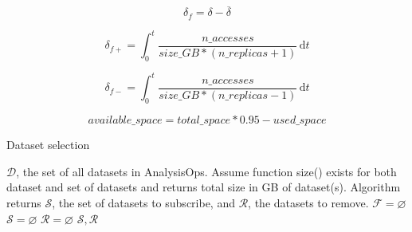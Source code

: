\documentclass[11pt,a4page]{article}
\begin{document}
    \begin{equation}\label{eq:delta_f}
      \delta_f = \delta - \overline{\delta}
    \end{equation}

    \begin{equation}\label{eq:delta_fp}
      \delta_{f+} = \int_0^t \! \frac{n\_accesses}{size\_GB*(n\_replicas+1)} \, \mathrm{d}t
    \end{equation}

    \begin{equation}\label{eq:delta_fm}
      \delta_{f-} = \int_0^t \! \frac{n\_accesses}{size\_GB*(n\_replicas-1)} \, \mathrm{d}t
    \end{equation}

    \begin{equation}\label{eq:avail}
      available\_space = total\_space*0.95 - used\_space
    \end{equation}

    \begin{algorithm} 
      \caption{Dataset selection} \label{alg:data_sel}
      \footnotesize
      \begin{algorithmic}[1]
        \REQUIRE $\mathcal{D}$, the set of all datasets in AnalysisOps. Assume function size() exists for both dataset and set of datasets and returns total size in GB of dataset(s). Algorithm returns $\mathcal{S}$, the set of datasets to subscribe, and $\mathcal{R}$, the datasets to remove.
        \STATE $\mathcal{F} = \varnothing$
         \label{for1}
        \ENDFOR
        \STATE $\mathcal{S} = \varnothing$
        \STATE $\mathcal{R} = \varnothing$
        \LOOP \label{loop1}
        \ENDLOOP
        \RETURN $\mathcal{S}, \mathcal{R}$
      \end{algorithmic}
    \end{algorithm}
\end{document}
